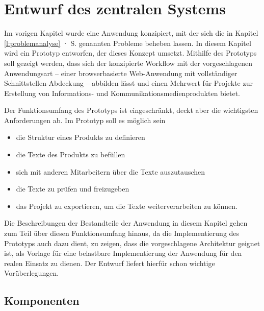 \section{Entwurf des zentralen Systems}\label{l:entwurf}

Im vorigen Kapitel wurde eine Anwendung konzipiert, mit der sich die in Kapitel \ref{l:problemanalyse} · S.\pageref{l:problemanalyse} genannten Probleme beheben lassen. In diesem Kapitel wird ein Prototyp entworfen, der dieses Konzept umsetzt. Mithilfe des Prototyps soll gezeigt werden, dass sich der konzipierte Workflow mit der vorgeschlagenen Anwendungsart -- einer browserbasierte Web-Anwendung mit vollständiger Schnittstellen-Abdeckung -- abbilden lässt und einen Mehrwert für Projekte zur Erstellung von Informations- und Kommunikationsmedienprodukten bietet. 

Der Funktionsumfang des Prototyps ist eingeschränkt, deckt aber die wichtigsten Anforderungen ab. Im Prototyp soll es möglich sein
\begin{itemize}\itemsep -5pt
\item die Struktur eines Produkts zu definieren
\item die Texte des Produkts zu befüllen
\item sich mit anderen Mitarbeitern über die Texte auszutauschen
\item die Texte zu prüfen und freizugeben
\item das Projekt zu exportieren, um die Texte weiterverarbeiten zu können.
\end{itemize}

Die Beschreibungen der Bestandteile der Anwendung in diesem Kapitel gehen zum Teil über diesen Funktionsumfang hinaus, da die Implementierung des Prototyps auch dazu dient, zu zeigen, dass die vorgeschlagene Architektur geignet ist, als Vorlage für eine belastbare Implementierung der Anwendung für den realen Einsatz zu dienen. Der Entwurf liefert hierfür schon wichtige Vorüberlegungen.

\pagebreak

\subsection{Komponenten}

